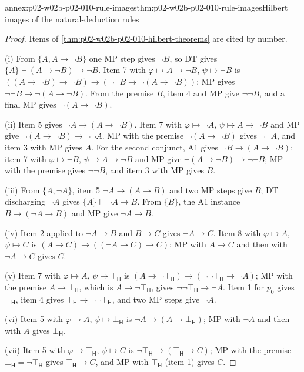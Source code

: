 \begin{annexitem}{annex:p02-w02b-p02-010-rule-images}{thm:p02-w02b-p02-010-rule-images}{Hilbert images of the natural-deduction rules}
\begin{proof}
Items of \cref{thm:p02-w02b-p02-010-hilbert-theorems} are cited by number.

(i) From \(\{A,A\to\neg B\}\) one MP step gives \(\neg B\), so DT gives
\(\{A\}\vdash(A\to\neg B)\to\neg B\).  Item 7 with
\(\varphi\mapsto A\to\neg B\), \(\psi\mapsto\neg B\) is
\(((A\to\neg B)\to\neg B)\to(\neg\neg B\to\neg(A\to\neg B))\); MP gives
\(\neg\neg B\to\neg(A\to\neg B)\).  From the premise \(B\), item 4 and MP
give \(\neg\neg B\), and a final MP gives \(\neg(A\to\neg B)\).

(ii) Item 5 gives \(\neg A\to(A\to\neg B)\).  Item 7 with
\(\varphi\mapsto\neg A\), \(\psi\mapsto A\to\neg B\) and MP give
\(\neg(A\to\neg B)\to\neg\neg A\).  MP with the premise
\(\neg(A\to\neg B)\) gives \(\neg\neg A\), and item 3 with MP gives \(A\).
For the second conjunct, A1 gives \(\neg B\to(A\to\neg B)\); item 7 with
\(\varphi\mapsto\neg B\), \(\psi\mapsto A\to\neg B\) and MP give
\(\neg(A\to\neg B)\to\neg\neg B\); MP with the premise gives
\(\neg\neg B\), and item 3 with MP gives \(B\).

(iii) From \(\{A,\neg A\}\), item 5 \(\neg A\to(A\to B)\) and two MP steps
give \(B\); DT discharging \(\neg A\) gives \(\{A\}\vdash\neg A\to B\).
From \(\{B\}\), the A1 instance \(B\to(\neg A\to B)\) and MP give
\(\neg A\to B\).

(iv) Item 2 applied to \(\neg A\to B\) and \(B\to C\) gives
\(\neg A\to C\).  Item 8 with \(\varphi\mapsto A\), \(\psi\mapsto C\) is
\((A\to C)\to((\neg A\to C)\to C)\); MP with \(A\to C\) and then with
\(\neg A\to C\) gives \(C\).

(v) Item 7 with \(\varphi\mapsto A\), \(\psi\mapsto\top_{\mathsf H}\) is
\((A\to\neg\top_{\mathsf H})\to(\neg\neg\top_{\mathsf H}\to\neg A)\); MP with
the premise \(A\to\bot_{\mathsf H}\), which is \(A\to\neg\top_{\mathsf H}\),
gives \(\neg\neg\top_{\mathsf H}\to\neg A\).  Item 1 for \(p_0\) gives
\(\top_{\mathsf H}\), item 4 gives
\(\top_{\mathsf H}\to\neg\neg\top_{\mathsf H}\), and two MP steps give
\(\neg A\).

(vi) Item 5 with \(\varphi\mapsto A\), \(\psi\mapsto\bot_{\mathsf H}\) is
\(\neg A\to(A\to\bot_{\mathsf H})\); MP with \(\neg A\) and then with \(A\)
gives \(\bot_{\mathsf H}\).

(vii) Item 5 with \(\varphi\mapsto\top_{\mathsf H}\), \(\psi\mapsto C\) is
\(\neg\top_{\mathsf H}\to(\top_{\mathsf H}\to C)\); MP with the premise
\(\bot_{\mathsf H}=\neg\top_{\mathsf H}\) gives \(\top_{\mathsf H}\to C\), and
MP with \(\top_{\mathsf H}\) (item 1) gives \(C\).


\end{proof}
\end{annexitem}
